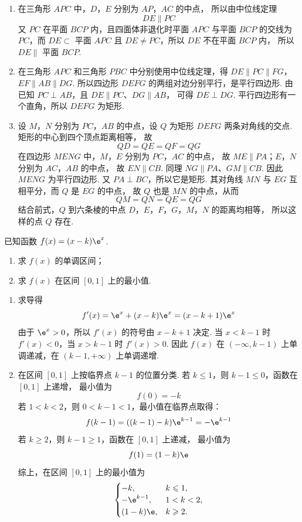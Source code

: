 \begin{solution}
\begin{enumerate}
\item 在三角形 \(APC\) 中，\(D\)，\(E\) 分别为 \(AP\)，\(AC\) 的中点，
所以由中位线定理
\[
DE\parallel PC
\]
又 \(PC\) 在平面 \(BCP\) 内，且四面体非退化时平面 \(APC\) 与平面
\(BCP\) 的交线为 \(PC\)，而 \(DE\subset\) 平面 \(APC\) 且
\(DE\ne PC\)，所以 \(DE\) 不在平面 \(BCP\) 内，
所以 \(DE\parallel\) 平面 \(BCP\).
\item 在三角形 \(APC\) 和三角形 \(PBC\) 中分别使用中位线定理，得
\(DE\parallel PC\parallel FG\)，\(EF\parallel AB\parallel DG\).
所以四边形 \(DEFG\) 的两组对边分别平行，是平行四边形.
由已知 \(PC\perp AB\)，且 \(DE\parallel PC\)、\(DG\parallel AB\)，
可得 \(DE\perp DG\). 平行四边形有一个直角，所以 \(DEFG\) 为矩形.
\item 设 \(M\)，\(N\) 分别为 \(PC\)，\(AB\) 的中点，设 \(Q\) 为矩形
\(DEFG\) 两条对角线的交点. 矩形的中心到四个顶点距离相等，
故
\[
QD=QE=QF=QG
\]
在四边形 \(MENG\) 中，\(M\)，\(E\) 分别为 \(PC\)，\(AC\) 的中点，
故 \(ME\parallel PA\)；\(E\)，\(N\) 分别为 \(AC\)，\(AB\) 的中点，
故 \(EN\parallel CB\). 同理 \(NG\parallel PA\)、\(GM\parallel CB\).
因此 \(MENG\) 为平行四边形. 又 \(PA\perp BC\)，所以它是矩形.
其对角线 \(MN\) 与 \(EG\) 互相平分，而 \(Q\) 是 \(EG\) 的中点，
故 \(Q\) 也是 \(MN\) 的中点，从而
\[
QM=QN=QE=QG
\]
结合前式，\(Q\) 到六条棱的中点 \(D\)，\(E\)，\(F\)，\(G\)，\(M\)，\(N\) 的距离均相等，
所以这样的点 \(Q\) 存在.
\end{enumerate}
\end{solution}

\begin{problem}
已知函数 \( f(x) = (x - k)\e^x \).
\begin{enumerate}
\item 求 \( f(x) \) 的单调区间；
\item 求 \( f(x) \) 在区间 \( [0,1] \) 上的最小值.
\end{enumerate}
\end{problem}

\begin{solution}
\begin{enumerate}
\item 求导得
\[
f'(x)=\e^x+(x-k)\e^x=(x-k+1)\e^x
\]
由于 \(\e^x>0\)，所以 \(f'(x)\) 的符号由 \(x-k+1\) 决定.
当 \(x<k-1\) 时 \(f'(x)<0\)，当 \(x>k-1\) 时 \(f'(x)>0\).
因此 \(f(x)\) 在 \((-\infty,k-1)\) 上单调递减，在
\((k-1,+\infty)\) 上单调递增.
\item 在区间 \([0,1]\) 上按临界点 \(k-1\) 的位置分类.
若 \(k\leqslant1\)，则 \(k-1\leqslant0\)，函数在 \([0,1]\) 上递增，
最小值为
\[
f(0)=-k
\]
若 \(1<k<2\)，则 \(0<k-1<1\)，最小值在临界点取得：
\[
f(k-1)=((k-1)-k)\e^{k-1}=-\e^{k-1}
\]
若 \(k\geqslant2\)，则 \(k-1\geqslant1\)，函数在 \([0,1]\) 上递减，
最小值为
\[
f(1)=(1-k)\e
\]
综上，在区间 \([0,1]\) 上的最小值为
\[
\begin{cases}
-k, & k\leqslant 1,\\
-\e^{k-1}, & 1<k<2,\\
(1-k)\e, & k\geqslant 2.
\end{cases}
\]
\end{enumerate}
\end{solution}

